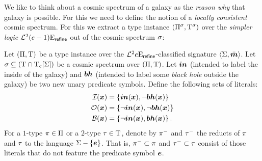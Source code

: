 We like to think about a cosmic spectrum of a galaxy as the \emph{reason why}
that galaxy is possible. For this we need to define the notion of a
\emph{locally consistent} cosmic spectrum. For this we extract a type instance
$(\Pi^{\sigma},\mathrm{T}^{\sigma})$ over the \emph{simpler logic}
$\mathcal{L}^{2}_{{}}{(e-1)}\mathrm{E}_{\mathsf{refine}}$ out of the cosmic spectrum $\sigma$:
\begin{definition}
Let $(\Pi,\mathrm{T})$ be a type instance over the
$\mathcal{L}^{2}_{{}}{e}\mathrm{E}_{\mathsf{refine}}$-classified signature $\left\langle \mathrm{\Sigma},\bar{\bm{m}} \right\rangle$.
Let $\sigma \subseteq (\mathrm{T} \cap \mathrm{T}_{\mathrm{c}}[\mathrm{\Sigma}])$ be a cosmic spectrum over
$(\Pi,\mathrm{T})$.
Let $\bm{in}$ (intended to label the inside of the galaxy) and $\bm{bh}$ (intended to
label some \emph{black hole} outside the galaxy) be two new unary predicate
symbols. Define the following sets of literals: 
\begin{align*}
  \mathcal{I}(\bm{x}) &= \left\{\bm{in}(\bm{x}),\lnot\bm{bh}(\bm{x})\right\} \\
  \mathcal{O}(\bm{x}) &= \left\{\lnot\bm{in}(\bm{x}), \lnot\bm{bh}(\bm{x})\right\} \\
  \mathcal{B}(\bm{x}) &= \left\{\lnot\bm{in}(\bm{x}), \bm{bh}(\bm{x})\right\}.
\end{align*}
For a $1$-type $\pi\in\Pi$ or a $2$-type $\tau\in\mathrm{T}$, denote by
$\pi^{-}$ and $\tau^{-}$ the reducts of $\pi$ and $\tau$ to the language $\mathrm{\Sigma} - \left\{\bm{e}\right\}$.
That is, $\pi^{-} \subset \pi$ and $\tau^{-} \subset \tau$ consist of
those literals that do not feature the predicate symbol $\bm{e}$.


\end{definition}
